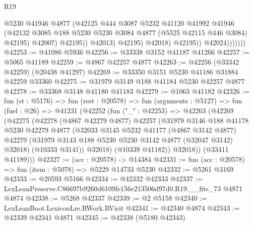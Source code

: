 \begin{lexlean}{R19}
\begin{coremodule}
                                @5230
                                @41946
                                @4877
                                (@42125
                                  @444
                                  @3087
                                  @5232
                                  @41120
                                  @41992
                                  @41946
                                  (@42132
                                    @3085
                                    @188
                                    @5230
                                    @5230
                                    @3084
                                    @4877
                                    (@5525 @42115 @446 @3084)
                                    @42195)
                                  @42007)
                                @42195))
                            @42013)
                          @42195)
                        @42018)
                      @42195))
                  @42024)))))))
@42253 := @41086 @5936
@42256 := @33338 @3152 @41187 @41266
@42257 := @5065 @41189
@42259 := @4867 @42257 @4877
@42263 := @42256 (@33342 @42259) (@20438 @41297)
@42269 := @33350 @3151 @5230 @41186 @31884 @42259 @33360
@42275 := @31979 @3149 @188 @41184 @5230 @42257 @4877
@42278 := @33368 @3148 @41180 @41183
@42279 := @1063 @41182
@42326 := fun (st : @5176) =>
  fun (rest : @20578) =>
  fun (arguments : @5127) =>
  fun (fuel : @26) =>
  @41231
    (@42252
      (fun ("_" : @42253) =>
      @42263
        (@42269
          (@42275
            (@42278
              (@4867 @42279 @4877)
              @42257
              (@31979
                @3146
                @188
                @41178
                @5230
                @42279
                @4877
                (@32033
                  @3145
                  @5232
                  @41177
                  (@4867 @3142 @4877)
                  @42279
                  (@31979 @3143 @188 @5230 @5230 @3142 @4877 (@32047 @3142) @32018)
                  (@10333 @3141))
                @32018)
              (@10339 @41182))
            @32018))
        (@33411 @41189)))
@42327 := (acc : @20578) -> @14384
@42331 := fun (acc : @20578) => fun (item : @5078) => @5229 @14733 @5230
@42332 := @5261 @3169
@42333 := @20593 @5166
@42334 := @42332 @42333
@42337 := LexLeanPreserve.C86697b9260d6109fe156e213506d97d0.R19.__fits_73 @4871 @4874
@42338 := @5268 @42337
@42339 := @2 @5158
@42340 := LexLeanBoot.LexiconLre.RWork.RVisit
@42341 := @42340 @4874
@42343 := @42339 @42341 @4871
@42345 := @42338 (@5180 @42343)

\end{coremodule}
\end{lexlean}
